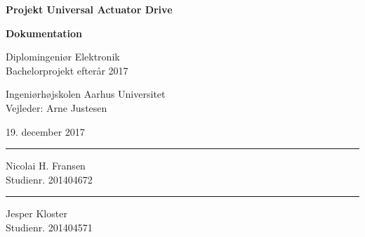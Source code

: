 \documentclass[11pt, a4paper, twoside, openany]{memoir}
\date{}
\author{\forfatter}
\title{\titel}
\begin{document}
\begin{titlingpage}
		
		\begin{center}
				{\huge\bfseries Projekt Universal Actuator Drive}\\
				\vspace{10pt}
				
				{\Huge\bfseries Dokumentation}\\
				
				\vspace{20pt}
				
				{Diplomingeniør Elektronik}\\
				{\large Bachelorprojekt efterår 2017}\\
				
				\vspace{10pt}
				
				Ingeniørhøjskolen Aarhus Universitet\\
				Vejleder: Arne Justesen
				\vspace{10pt}
				
				19. december 2017
				\vspace{10pt}

				\vspace{50pt}
				\begin{minipage}{0.25\linewidth}
					\centering
					\hrule
					\vspace{12pt}
					Nicolai H. Fransen\\
					Studienr. 201404672
				\end{minipage}
				\hspace{10pt}
				\begin{minipage}{0.25\linewidth}
					\centering
					\hrule
					\vspace{12pt}
					Jesper Kloster\\
					Studienr. 201404571
				\end{minipage}
				\hspace{10pt}
		\end{center}
		
		\clearpage
		
	\setcounter{tocdepth}{2}
	\tableofcontents
	\clearpage
	
	
	
	

\end{titlingpage}
\end{document}
